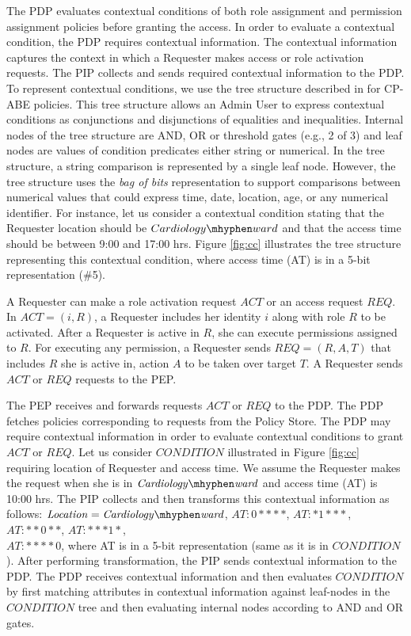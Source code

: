 \documentclass[final,5p,times,twocolumn]{elsarticle}
\begin{document}
The PDP evaluates contextual conditions of both role assignment and permission assignment policies before granting the access. In order to evaluate a contextual condition, the PDP requires contextual information. The contextual information captures the context in which a Requester makes access or role activation requests. The PIP collects and sends required contextual information to the PDP. To represent contextual conditions, we use the tree structure described in \cite{Bethencourt2007} for CP-ABE policies. This tree structure allows an Admin User to express contextual conditions as conjunctions and disjunctions of equalities and inequalities. Internal nodes of the tree structure are AND, OR or threshold gates (e.g., 2 of 3) and leaf nodes are values of condition predicates either string or numerical. In the tree structure, a string comparison is represented by a single leaf node. However, the tree structure uses the \emph{bag of bits} representation to support comparisons between numerical values that could express time, date, location, age, or any numerical identifier. For instance, let us consider a contextual condition stating that the Requester location should be $Cardiology \mhyphen ward$ and that the access time should be between 9:00 and 17:00 hrs. Figure \ref{fig:cc} illustrates the tree structure representing this contextual condition, where access time (AT) is in a 5-bit representation (\#5).


A Requester can make a role activation request $\mathit{ACT}$ or an access request $\mathit{REQ}$. In $ACT = (i, R)$, a Requester includes her identity $i$ along with role $R$ to be activated. After a Requester is active in $R$, she can execute permissions assigned to $R$. For executing any permission, a Requester sends $REQ = (R, A, T)$ that includes $R$ she is active in, action $A$ to be taken over target $T$. A Requester sends $\mathit{ACT}$ or $\mathit{REQ}$ requests to the PEP. 

The PEP receives and forwards requests $\mathit{ACT}$ or $\mathit{REQ}$ to the PDP. The PDP fetches policies corresponding to requests from the Policy Store. The PDP may require contextual information in order to evaluate contextual conditions to grant $\mathit{ACT}$ or $\mathit{REQ}$. Let us consider $\mathit{CONDITION}$ illustrated in Figure \ref{fig:cc} requiring location of Requester and access time. We assume the Requester makes the request when she is in $\mathit{Cardiology \mhyphen ward}$ and access time (AT) is 10:00 hrs. The PIP collects and then transforms this contextual information as follows: $\mathit{Location = Cardiology \mhyphen ward}$, $\mathit{AT : 0****}$, $\mathit{AT: *1***}$, $\mathit{AT: **0**}$, $\mathit{AT: ***1*}$, \\ $\mathit{AT: ****0}$, where AT is in a 5-bit representation (same as it is in $\mathit{CONDITION}$). After performing transformation, the PIP sends contextual information to the PDP. The PDP receives contextual information and then evaluates $\mathit{CONDITION}$ by first matching attributes in contextual information against leaf-nodes in the $\mathit{CONDITION}$ tree and then evaluating internal nodes according to AND and OR gates.
\end{document}
